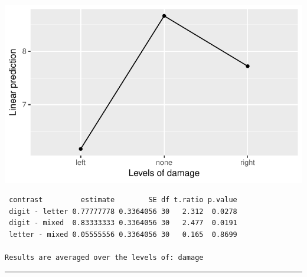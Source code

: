 \documentclass[]{article}
\newenvironment{Shaded}{\begin{snugshade}}{\end{snugshade}}
\newcommand{\KeywordTok}[1]{\textcolor[rgb]{0.13,0.29,0.53}{\textbf{#1}}}
\newcommand{\DataTypeTok}[1]{\textcolor[rgb]{0.13,0.29,0.53}{#1}}
\newcommand{\StringTok}[1]{\textcolor[rgb]{0.31,0.60,0.02}{#1}}
\newcommand{\CommentTok}[1]{\textcolor[rgb]{0.56,0.35,0.01}{\textit{#1}}}
\newcommand{\OperatorTok}[1]{\textcolor[rgb]{0.81,0.36,0.00}{\textbf{#1}}}
\newcommand{\NormalTok}[1]{#1}
\begin{document}
\begin{center}\includegraphics{Unit_5_assignment_KEY_R__spr18__files/figure-latex/unnamed-chunk-75-1} \end{center}

\clearpage

\begin{Shaded}
\end{Shaded}

\begin{verbatim}
 contrast         estimate        SE df t.ratio p.value
 digit - letter 0.77777778 0.3364056 30   2.312  0.0278
 digit - mixed  0.83333333 0.3364056 30   2.477  0.0191
 letter - mixed 0.05555556 0.3364056 30   0.165  0.8699

Results are averaged over the levels of: damage 
\end{verbatim}

\begin{center}\rule{0.5\linewidth}{\linethickness}\end{center}

\begin{Shaded}
\end{Shaded}
\end{document}
